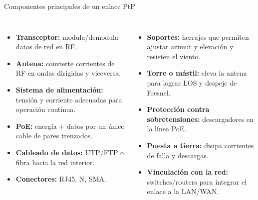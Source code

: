 \begin{frame}{Componentes principales de un enlace PtP}
  \small
  \begin{columns}[T]
    \begin{itemize}
      \item \textbf{Transceptor:} modula/demodula datos de red en RF.
      \item \textbf{Antena:} convierte corrientes de RF en ondas dirigidas y viceversa.
      \item \textbf{Sistema de alimentación:} tensión y corriente adecuadas para operación continua.
      \item \textbf{PoE:} energía + datos por un único cable de pares trenzados.
      \item \textbf{Cableado de datos:} UTP/FTP o fibra hacia la red interior.
      \item \textbf{Conectores:} RJ45, N, SMA.
    \end{itemize}
    \begin{itemize}
      \item \textbf{Soportes:} herrajes que permiten ajustar azimut y elevación y resisten el viento.
      \item \textbf{Torre o mástil:} eleva la antena para lograr LOS y despeje de Fresnel.
      \item \textbf{Protección contra sobretensiones:} descargadores en la línea PoE.
      \item \textbf{Puesta a tierra:} disipa corrientes de falla y descargas.
      \item \textbf{Vinculación con la red:} switches/routers para integrar el enlace a la LAN/WAN.
    \end{itemize}
  \end{columns}
\end{frame}

